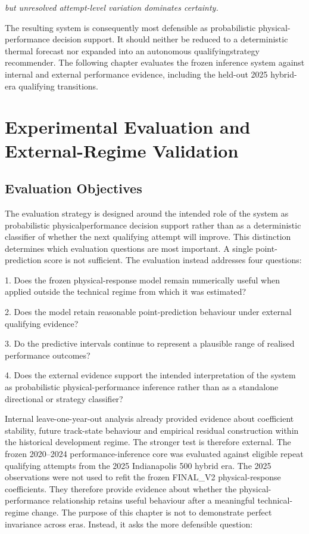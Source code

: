\begin{center}\textit{but unresolved attempt-level variation dominates certainty.}\end{center}

The resulting system is consequently most defensible as probabilistic physical-performance decision support. It should neither be reduced to a deterministic thermal forecast nor expanded into an autonomous qualifyingstrategy recommender. The following chapter evaluates the frozen inference system against internal and external performance evidence, including the held-out 2025 hybrid-era qualifying transitions.

\section{Experimental Evaluation and External-Regime Validation}
\label{sec:eval}

\subsection{Evaluation Objectives}
The evaluation strategy is designed around the intended role of the system as probabilistic physicalperformance decision support rather than as a deterministic classifier of whether the next qualifying attempt will improve. This distinction determines which evaluation questions are most important. A single point-prediction score is not sufficient. The evaluation instead addresses four questions:

1. Does the frozen physical-response model remain numerically useful when applied outside the technical regime from which it was estimated?

2. Does the model retain reasonable point-prediction behaviour under external qualifying evidence?

3. Do the predictive intervals continue to represent a plausible range of realised performance outcomes?

4. Does the external evidence support the intended interpretation of the system as probabilistic physical-performance inference rather than as a standalone directional or strategy classifier?

Internal leave-one-year-out analysis already provided evidence about coefficient stability, future track-state behaviour and empirical residual construction within the historical development regime. The stronger test is therefore external. The frozen 2020--2024 performance-inference core was evaluated against eligible repeat qualifying attempts from the 2025 Indianapolis 500 hybrid era. The 2025 observations were not used to refit the frozen FINAL\_V2 physical-response coefficients. They therefore provide evidence about whether the physical-performance relationship retains useful behaviour after a meaningful technical-regime change. The purpose of this chapter is not to demonstrate perfect invariance across eras. Instead, it asks the more defensible question:

